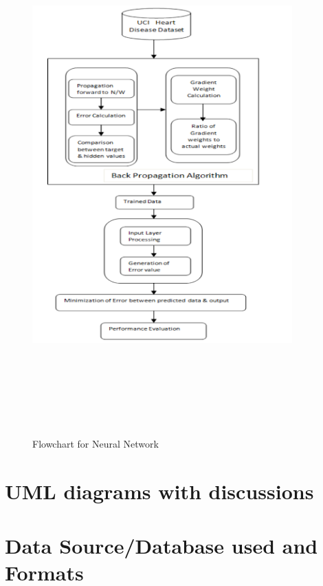 \documentclass{book}
\begin{document}
\begin{figure}
	\begin{center}
		\includegraphics[width=10cm, height=20cm]{images/neural_network.png}
		\caption{Flowchart for Neural Network}	
	\end{center}
\end{figure}

	\section{UML diagrams with discussions}
  	
  	\section{Data Source/Database used and Formats}
\end{document}
